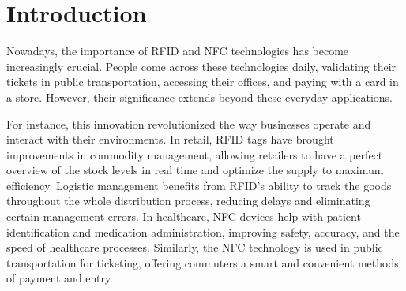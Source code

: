 \chapter*{Introduction}
\setcounter{page}{1}


Nowadays, the importance of RFID and NFC technologies has become increasingly crucial. People come across these technologies daily, validating their tickets in public transportation, accessing their offices, and paying with a card in a store. However, their significance extends beyond these everyday applications.

For instance, this innovation revolutionized the way businesses operate and interact with their environments. In retail, RFID tags have brought improvements in commodity management, allowing retailers to have a perfect overview of the stock levels in real time and optimize the supply to maximum efficiency. Logistic management benefits from RFID's ability to track the goods throughout the whole distribution process, reducing delays and eliminating certain management errors. In healthcare, NFC devices help with patient identification and medication administration, improving safety, accuracy, and the speed of healthcare processes. \cite{pirrone2012mobile} Similarly, the NFC technology is used in public transportation for ticketing, offering commuters a smart and convenient methods of payment and entry.

